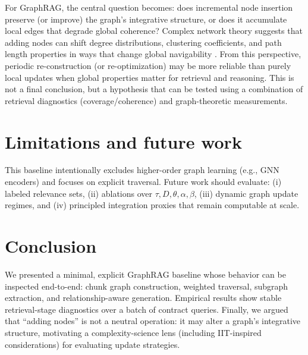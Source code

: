 \documentclass[11pt]{article}
\begin{document}
For GraphRAG, the central question becomes: does incremental node insertion preserve (or improve) the graph's integrative structure, or does it accumulate local edges that degrade global coherence? Complex network theory suggests that adding nodes can shift degree distributions, clustering coefficients, and path length properties in ways that change global navigability \citep{newman2010networks,watts1998smallworld,barabasi1999scale}. From this perspective, periodic re-construction (or re-optimization) may be more reliable than purely local updates when global properties matter for retrieval and reasoning. This is not a final conclusion, but a hypothesis that can be tested using a combination of retrieval diagnostics (coverage/coherence) and graph-theoretic measurements.

\section{Limitations and future work}
This baseline intentionally excludes higher-order graph learning (e.g., GNN encoders) and focuses on explicit traversal. Future work should evaluate:
(i) labeled relevance sets, (ii) ablations over $\tau,D,\theta,\alpha,\beta$, (iii) dynamic graph update regimes, and (iv) principled integration proxies that remain computable at scale.

\section{Conclusion}
We presented a minimal, explicit GraphRAG baseline whose behavior can be inspected end-to-end: chunk graph construction, weighted traversal, subgraph extraction, and relationship-aware generation. Empirical results show stable retrieval-stage diagnostics over a batch of contract queries. Finally, we argued that ``adding nodes'' is not a neutral operation: it may alter a graph's integrative structure, motivating a complexity-science lens (including IIT-inspired considerations) for evaluating update strategies.

\appendix
\end{document}
